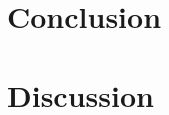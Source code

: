 \documentclass{article}
\begin{document}


\section{Conclusion}



\section{Discussion}





\newpage

\begin{appendices}



\end{appendices}
\end{document}
